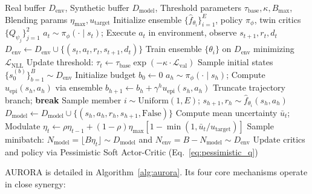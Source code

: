 \documentclass[11pt,a4paper]{article}
\theoremstyle{definition}
\theoremstyle{remark}
\begin{document}
\begin{algorithm}[t]
\caption{AURORA Online Training Loop}
\label{alg:aurora}
\begin{algorithmic}[1]
\REQUIRE Real buffer $D_{\text{env}}$, Synthetic buffer $D_{\text{model}}$, Threshold parameters $\tau_{\text{base}}, \kappa, B_{\max}$, Blending params $\eta_{\max}, u_{\text{target}}$
\STATE Initialize ensemble $\{\hat{f}_{\theta_i}\}_{i=1}^E$, policy $\pi_\phi$, twin critics $\{Q_{\psi_j}\}_{j=1}^2$
    \STATE $a_t \sim \pi_\phi(\cdot \mid s_t)$; Execute $a_t$ in environment, observe $s_{t+1}, r_t, d_t$
    \STATE $D_{\text{env}} \leftarrow D_{\text{env}} \cup \{(s_t, a_t, r_t, s_{t+1}, d_t)\}$
        \STATE Train ensemble $\{\theta_i\}$ on $D_{\text{env}}$ minimizing $\mathcal{L}_{\text{NLL}}$
        \STATE Update threshold: $\tau_t \leftarrow \tau_{\text{base}} \exp(-\kappa \cdot \mathcal{L}_{\text{val}})$
    \ENDIF
    \STATE Sample initial states $\{s_0^{(b)}\}_{b=1}^B \sim D_{\text{env}}$
        \STATE Initialize budget $b_0 \leftarrow 0$
            \STATE $a_h \sim \pi_\phi(\cdot \mid s_h)$; Compute $u_{\text{epi}}(s_h, a_h)$ via ensemble
            \STATE $b_{h+1} \leftarrow b_h + \gamma^h u_{\text{epi}}(s_h, a_h)$
                \STATE Truncate trajectory branch; \textbf{break}
            \ENDIF
            \STATE Sample member $i \sim \text{Uniform}(1, E)$; $s_{h+1}, r_h \sim \hat{f}_{\theta_i}(s_h, a_h)$
            \STATE $D_{\text{model}} \leftarrow D_{\text{model}} \cup \{(s_h, a_h, r_h, s_{h+1}, \text{False})\}$
        \ENDFOR
    \ENDFOR
    \STATE Compute mean uncertainty $\bar{u}_t$; Modulate $\eta_t \leftarrow \rho \eta_{t-1} + (1 - \rho) \eta_{\max}[1 - \min(1, \bar{u}_t / u_{\text{target}})]$
    \STATE Sample minibatch: $N_{\text{model}} = \lfloor B \eta_t \rfloor \sim D_{\text{model}}$ and $N_{\text{env}} = B - N_{\text{model}} \sim D_{\text{env}}$
    \STATE Update critics and policy via Pessimistic Soft Actor-Critic (Eq.~\ref{eq:pessimistic_q})
\ENDFOR
\end{algorithmic}
\end{algorithm}

AURORA is detailed in Algorithm~\ref{alg:aurora}. Its four core mechanisms operate in close synergy:
\end{document}

